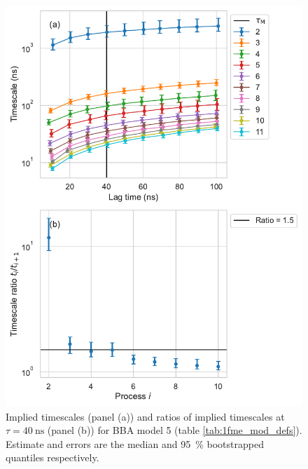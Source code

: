 \documentclass{article}
\begin{document}
\begin{figure}
    \centering
    \includegraphics[height=0.65\textheight]{figures/its/bba/BBA_model_dihed._method_m2.pdf}
    \caption{Implied timescales (panel (a)) and ratios of implied timescales at $\tau=\SI{40}{\nano\second}$ (panel (b)) for BBA model 5 (table \ref{tab:1fme_mod_defs}). Estimate and errors are the median and \SI{95}{\percent} bootstrapped quantiles respectively.}
    \label{fig:its_bba_5}
\end{figure}
\end{document}
